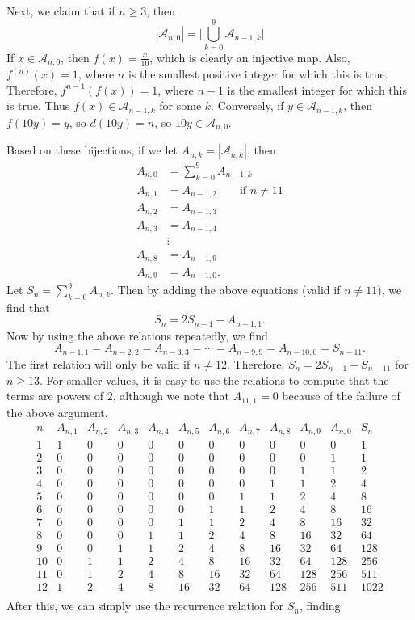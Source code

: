 \begin{enumerate}
 Next, we claim that if $n\ge 3$, then
 \[|\mathcal{A}_{n,0}|=\Big|\bigcup_{k=0}^9\mathcal{A}_{n-1,k}\Big|\]If $x\in\mathcal{A}_{n,0}$, then $f(x)=\frac{x}{10}$, which is clearly an injective map.  Also, $f^{(n)}(x)=1$, where $n$ is the smallest positive integer for which this is true. Therefore, $f^{{n-1}}(f(x))=1$, where $n-1$ is the smallest integer for which this is true. Thus $f(x)\in\mathcal{A}_{n-1,k}$ for some $k$. Conversely, if $y\in \mathcal{A}_{n-1,k}$, then $f(10y)=y$, so $d(10y)=n$, so $10y\in\mathcal{A}_{n,0}$.

 Based on these bijections, if we let $A_{n,k}=|\mathcal{A}_{n,k}|$, then
 \begin{align*} A_{n,0}&=\sum_{k=0}^{9} A_{n-1,k}\\ A_{n,1}&=A_{n-1,2}\qquad\text{if }n\ne 11\\ A_{n,2}&=A_{n-1,3}\\ A_{n,3}&=A_{n-1,4}\\ &\vdots\\ A_{n,8}&=A_{n-1,9}\\ A_{n,9}&=A_{n-1,0}. \end{align*}
Let $S_n=\sum_{k=0}^9 A_{n,k}$. Then by adding the above equations (valid if $n\ne 11$), we find that
 \[S_n=2S_{n-1}-A_{n-1,1}.\]Now by using the above relations repeatedly, we find
 \[A_{n-1,1}=A_{n-2,2}=A_{n-3,3}=\cdots=A_{n-9,9}=A_{n-10,0}=S_{n-11}.\]The first relation will only be valid if $n\ne 12$. Therefore, $S_n=2S_{n-1}-S_{n-11}$ for $n\ge 13$. For smaller values, it is easy to use the relations to compute that the terms are powers of $2$, although we note that $A_{11,1}=0$ because of the failure of the above argument.
 \[\begin{array}{c|cccccccccc|c} n&A_{n,1}&A_{n,2}&A_{n,3}&A_{n,4}&A_{n,5}&A_{n,6}&A_{n,7}&A_{n,8}&A_{n,9}&A_{n,0}&S_{n}\\\hline 1&1&0&0&0&0&0&0&0&0&0&1\\ 2&0&0&0&0&0&0&0&0&0&1&1\\ 3&0&0&0&0&0&0&0&0&1&1&2\\ 4&0&0&0&0&0&0&0&1&1&2&4\\ 5&0&0&0&0&0&0&1&1&2&4&8\\ 6&0&0&0&0&0&1&1&2&4&8&16\\ 7&0&0&0&0&1&1&2&4&8&16&32\\ 8&0&0&0&1&1&2&4&8&16&32&64\\ 9&0&0&1&1&2&4&8&16&32&64&128\\ 10&0&1&1&2&4&8&16&32&64&128&256\\ 11&\boxed{0}&1&2&4&8&16&32&64&128&256&511\\ 12&1&2&4&8&16&32&64&128&256&511&1022\\ \end{array}\]After this, we can simply use the recurrence relation for $S_n$, finding

\end{enumerate}
